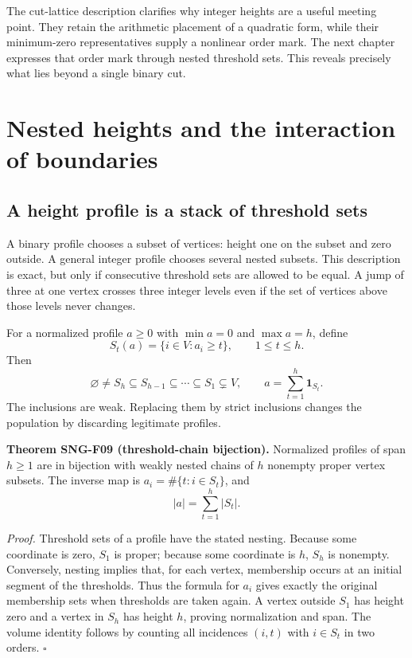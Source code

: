 \documentclass[
  11pt,
  a4paper,
]{report}
\begin{document}
The cut-lattice description clarifies why integer heights are a useful
meeting point. They retain the arithmetic placement of a quadratic form,
while their minimum-zero representatives supply a nonlinear order mark.
The next chapter expresses that order mark through nested threshold
sets. This reveals precisely what lies beyond a single binary cut.

\hypertarget{nested-heights-and-the-interaction-of-boundaries}{%
\chapter{Nested heights and the interaction of
boundaries}\label{nested-heights-and-the-interaction-of-boundaries}}

\hypertarget{a-height-profile-is-a-stack-of-threshold-sets}{%
\section{A height profile is a stack of threshold
sets}\label{a-height-profile-is-a-stack-of-threshold-sets}}

A binary profile chooses a subset of vertices: height one on the subset
and zero outside. A general integer profile chooses several nested
subsets. This description is exact, but only if consecutive threshold
sets are allowed to be equal. A jump of three at one vertex crosses
three integer levels even if the set of vertices above those levels
never changes.

For a normalized profile \(a\ge0\) with \(\min a=0\) and \(\max a=h\),
define \[
S_t(a)=\{i\in V:a_i\ge t\},\qquad 1\le t\le h.
\] Then \[
\varnothing\ne S_h\subseteq S_{h-1}\subseteq\cdots\subseteq S_1\subsetneq V,
\qquad
a=\sum_{t=1}^h\mathbf1_{S_t}.
\] The inclusions are weak. Replacing them by strict inclusions changes
the population by discarding legitimate profiles.

\textbf{Theorem SNG-F09 (threshold-chain bijection).} Normalized
profiles of span \(h\ge1\) are in bijection with weakly nested chains of
\(h\) nonempty proper vertex subsets. The inverse map is
\(a_i=\#\{t:i\in S_t\}\), and \[
|a|=\sum_{t=1}^h|S_t|.
\]

\emph{Proof.} Threshold sets of a profile have the stated nesting.
Because some coordinate is zero, \(S_1\) is proper; because some
coordinate is \(h\), \(S_h\) is nonempty. Conversely, nesting implies
that, for each vertex, membership occurs at an initial segment of the
thresholds. Thus the formula for \(a_i\) gives exactly the original
membership sets when thresholds are taken again. A vertex outside
\(S_1\) has height zero and a vertex in \(S_h\) has height \(h\),
proving normalization and span. The volume identity follows by counting
all incidences \((i,t)\) with \(i\in S_t\) in two orders. \(\square\)
\end{document}
